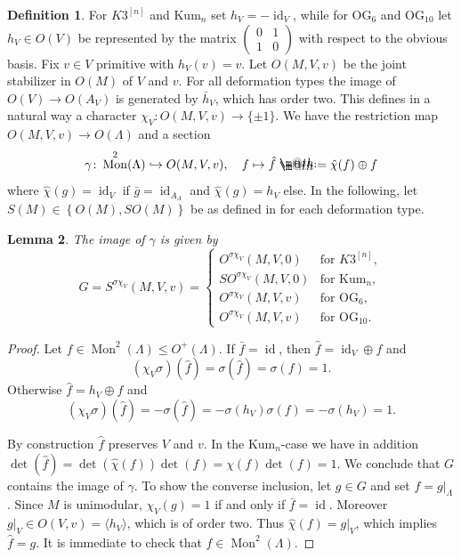 \documentclass{amsart}
\makeatletter
\theoremstyle{definition}
\newtheorem{definition}{Definition}[section]
\theoremstyle{plain}
\newtheorem{lemma}[definition]{Lemma}
\DeclareMathOperator{\id}{id}
\DeclareMathOperator{\Mo}{Mon}
\newcommand{\kumn}{\mathrm{Kum}_n}
\newcommand{\hskn}{K3^{\left[n\right]}}
\newcommand*{\defeq}{\mathrel{\rlap{%
                     \raisebox{0.3ex}{$\m@th\cdot$}}%
                     \raisebox{-0.3ex}{$\m@th\cdot$}}%
                     =}
\makeatother
\begin{document}
\begin{definition}
For $\hskn$ and $\kumn$ set $h_V=-\id_V$, while for
OG$_6$ and OG$_{10}$ let
$h_V \in O(V)$ be represented by the matrix $\left(\begin{smallmatrix}
          0 & 1\\
          1 & 0
         \end{smallmatrix}\right)$ with respect to the obvious basis. Fix $v \in V$ primitive with $h_V(v)=v$.
Let $O(M,V,v)$ be the joint stabilizer in $O(M)$ of $V$ and $v$. For all deformation types the image of $O(V) \rightarrow O(A_V)$ is generated by $\bar h_V$, which has order two. This defines in a natural way a character $\chi_V\colon O(M,V,v) \rightarrow \{\pm 1\}$.
We have the restriction map $O(M,V,v) \rightarrow O(\Lambda)$ and
a section
\[\gamma \colon \Mo^2(\Lambda) \hookrightarrow O(M,V,v), \quad f \mapsto \hat{f}\defeq \hat{\chi}(f) \oplus f\]
where $\hat{\chi}(g)= \id_V$ if $\bar g = \id_{A_\Lambda}$ and $\hat{\chi}(g) = h_V$ else. In the following, let $S(M) \in \left\{O(M), SO(M) \right\}$ be as defined in  for each deformation type.

\end{definition}
\begin{lemma}
The image of $\gamma$ is given by
\[G =S^{\sigma\chi_V}(M,V,v)=\begin{cases}
O^{\sigma\chi_V}(M,V,0) & \mbox{for } \hskn,\\
SO^{\sigma\chi_V}(M,V,0) & \mbox{for } \kumn,\\
O^{\sigma\chi_V}(M,V,v) & \mbox{for } \textrm{OG}_6,\\
O^{\sigma\chi_V}(M,V,v) & \mbox{for } \textrm{OG}_{10}.
\end{cases}\]
\end{lemma}
\begin{proof}
Let $f \in \Mo^2(\Lambda)\leq O^+(\Lambda)$.
If $\bar f = \id$, then $\hat{f}= \id_V \oplus f$ and
\[(\chi_V\sigma)(\hat{f})=\sigma(\hat{f})=\sigma(f)=1.\]
Otherwise $\hat{f} = h_V \oplus f$ and
\[(\chi_V\sigma)(\hat{f})=-\sigma(\hat{f})=-\sigma(h_V)\sigma(f)=-\sigma(h_V)=1.\]

By construction $\hat{f}$ preserves $V$ and $v$.
In the $\kumn$-case we have in addition $\det(\hat{f})=\det(\hat{\chi}(f))\det(f) = \chi(f) \det(f)=1$.
We conclude that $G$ contains the image of $\gamma$.
To show the converse inclusion, let $g \in G$ and set
$f=g|_\Lambda$. 
Since $M$ is unimodular, $\chi_V(g)=1$ if and only if $\bar f = \id$.
Moreover $g\vert_V \in O(V,v)=\langle h_V \rangle$, which is of order two. Thus $\hat\chi(f) = g\vert_V$, which implies $\hat f = g$. It is immediate to check that $f \in \Mo^2(\Lambda)$.
\end{proof}
\end{document}
